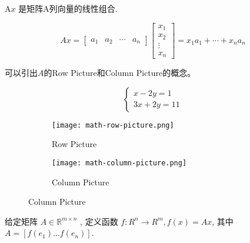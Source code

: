 \begin{corollary}
    $ \mathrm{A} x $ 是矩阵A列向量的线性组合.

$$
A x=\left[\begin{array}{llll}
a_{1} & a_{2} & \cdots & a_{n}
\end{array}\right]\left[\begin{array}{c}
x_{1} \\
x_{2} \\
\vdots \\
x_{n}
\end{array}\right]=x_{1} a_{1}+\cdots+x_{n} a_{n}
$$
\end{corollary}

可以引出$A$的Row Picture和Column Picture的概念。

\begin{example}
    $$\left\{\begin{matrix} 
        x - 2y=1 \\  
        3x+2y=11 
      \end{matrix}\right. $$

    \begin{center}
        \begin{figure}[htbp]
        \begin{subfigure}[b]{0.8\textwidth}
            \centering
            \caption{Row Picture}
        \texttt{[image: math-row-picture.png]}
        \end{subfigure}
    
       
        \begin{subfigure}[b]{0.8\textwidth}
            \centering
            \caption{Column Picture}
        \texttt{[image: math-column-picture.png]}
        \end{subfigure}
        \end{figure}
    \end{center}
    
\end{example}

\begin{definition}[矩阵-向量乘积函数 $f(x)=A x$]
    给定矩阵 $ A \in \mathbb{R}^{m \times n} $ , 定义函数 $ f: R^{n} \rightarrow R^{m}, f(x)=A x $, 其中 $ A=\left[f\left(e_{1}\right) \ldots f\left(e_{n}\right)\right] $.
\end{definition}

